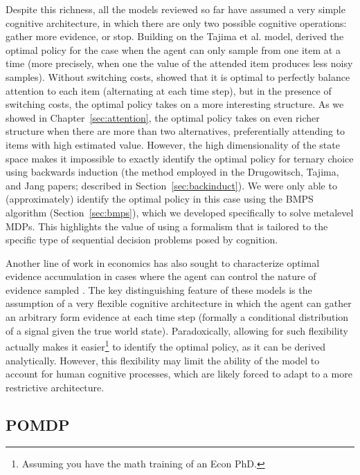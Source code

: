 Despite this richness, all the models reviewed so far have assumed a very simple cognitive architecture, in which there are only two possible cognitive operations: gather more evidence, or stop. Building on the Tajima et al. model, \citet{jang2021optimal} derived the optimal policy for the case when the agent can only sample from one item at a time (more precisely, when one the value of the attended item produces less noisy samples). Without switching costs, \citet{fudenberg2018speed} showed that it is optimal to perfectly balance attention to each item (alternating at each time step), but in the presence of switching costs, the optimal policy takes on a more interesting structure. As we showed in Chapter~\ref{sec:attention}, the optimal policy takes on even richer structure when there are more than two alternatives, preferentially attending to items with high estimated value. However, the high dimensionality of the state space makes it impossible to exactly identify the optimal policy for ternary choice using backwards induction (the method employed in the Drugowitsch, Tajima, and Jang papers; described in Section~\ref{sec:backinduct}). We were only able to (approximately) identify the optimal policy in this case using the BMPS algorithm (Section~\ref{sec:bmps}), which we developed specifically to solve metalevel MDPs. This highlights the value of using a formalism that is tailored to the specific type of sequential decision problems posed by cognition.

Another line of work in economics has also sought to characterize optimal evidence accumulation in cases where the agent can control the nature of evidence sampled \citep{woodford2014stochastic,hebert2017rational}. The key distinguishing feature of these models is the assumption of a very flexible cognitive architecture in which the agent can gather an arbitrary form evidence at each time step (formally a conditional distribution of a signal given the true world state). Paradoxically, allowing for such flexibility actually makes it easier\footnote{%
  Assuming you have the math training of an Econ PhD.
} to identify the optimal policy, as it can be derived analytically. However, this flexibility may limit the ability of the model to account for human cognitive processes, which are likely forced to adapt to a more restrictive architecture.

\subsection{POMDP}\label{sec:alternative-pomdp}


